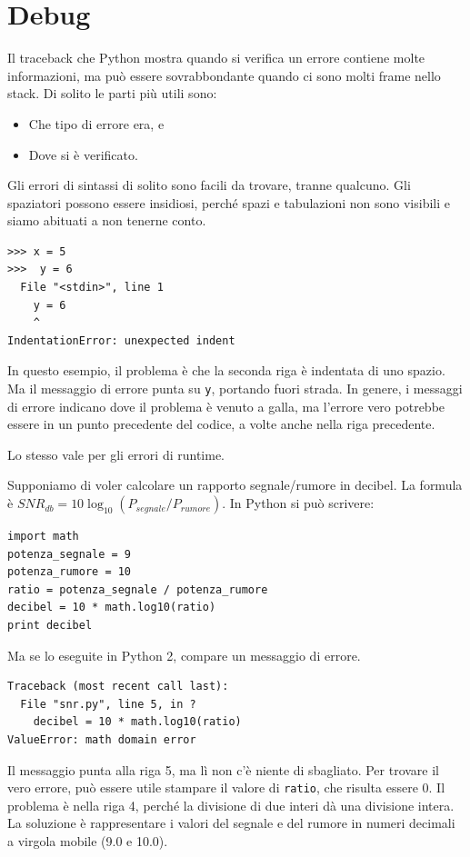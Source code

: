 \documentclass[10pt]{book}
\begin{document}
\section{Debug}
\label{whitespace}

Il traceback che Python mostra quando si verifica un errore contiene molte informazioni, ma può essere sovrabbondante quando ci sono molti frame nello stack. Di solito le parti più utili sono:

\begin{itemize}

\item Che tipo di errore era, e

\item Dove si è verificato.

\end{itemize}

Gli errori di sintassi di solito sono facili da trovare, tranne qualcuno. Gli spaziatori possono essere insidiosi, perché spazi e tabulazioni non sono visibili e siamo abituati a non tenerne conto.

\begin{verbatim}
>>> x = 5
>>>  y = 6
  File "<stdin>", line 1
    y = 6
    ^
IndentationError: unexpected indent
\end{verbatim}
%
In questo esempio, il problema è che la seconda riga è indentata di uno spazio. Ma il messaggio di errore punta su {\tt y}, portando fuori strada. In genere, i messaggi di errore indicano dove il problema è venuto a galla, ma l'errore vero potrebbe essere in un punto precedente del codice, a volte anche nella riga precedente.


Lo stesso vale per gli errori di runtime. 

Supponiamo di voler calcolare un rapporto segnale/rumore in decibel. La formula è
 $SNR_{db} = 10 \log_{10} (P_{segnale} / P_{rumore})$. In Python si può scrivere:

\begin{verbatim}
import math
potenza_segnale = 9
potenza_rumore = 10
ratio = potenza_segnale / potenza_rumore
decibel = 10 * math.log10(ratio)
print decibel
\end{verbatim}
%
Ma se lo eseguite in Python 2, compare un messaggio di errore.

\begin{verbatim}
Traceback (most recent call last):
  File "snr.py", line 5, in ?
    decibel = 10 * math.log10(ratio)
ValueError: math domain error
\end{verbatim}
%
Il messaggio punta alla riga 5, ma lì non c'è niente di sbagliato. Per trovare il vero errore, può essere utile stampare il valore di {\tt ratio}, che risulta essere 0. Il problema è nella riga 4, perché la divisione di due interi dà una divisione intera. La soluzione è rappresentare i valori del segnale e del rumore in numeri decimali a virgola mobile (9.0 e 10.0).
\end{document}
